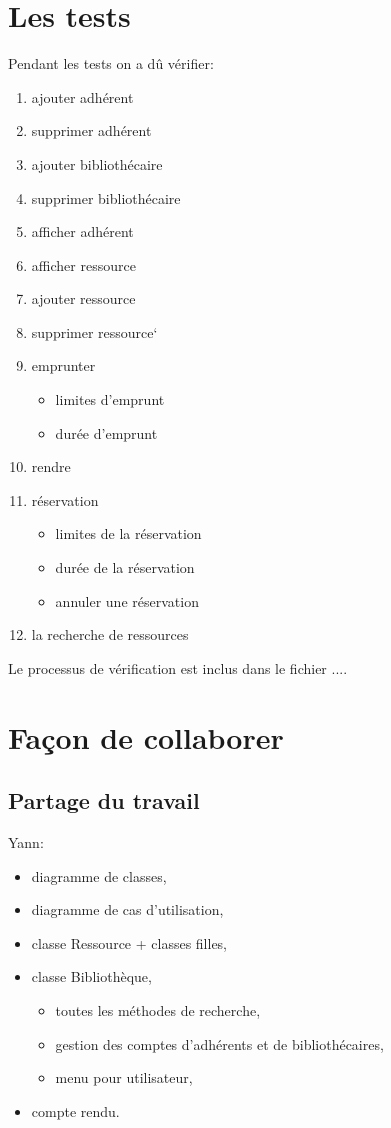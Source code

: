 \documentclass[10pt, a4paper]{article}
\begin{document}
	\section{Les tests}
	Pendant les tests on a dû vérifier:
	\begin{enumerate}
		\item ajouter adhérent
		\item supprimer adhérent
		\item ajouter bibliothécaire
		\item supprimer bibliothécaire
		\item afficher adhérent
		\item afficher ressource
		\item ajouter ressource
		\item supprimer ressource`
		\item emprunter
		\begin{itemize}
			\item limites d'emprunt
			\item durée d'emprunt
		\end{itemize}
		\item rendre
		\item réservation
		\begin{itemize}
			\item limites de la réservation
			\item durée de  la réservation
			\item annuler une réservation
		\end{itemize}
		\item la recherche de ressources 
	\end{enumerate}
	
	
	Le processus de vérification est inclus dans le fichier ....
	
	\section{Façon de collaborer}
		\subsection{Partage du travail}
		Yann:
		\begin{itemize}
			\item diagramme de classes,
			\item diagramme de cas d'utilisation,
			\item classe Ressource + classes filles,
			\item classe Bibliothèque,
			\begin{itemize}
				\item toutes les méthodes de recherche,
				\item gestion des comptes d'adhérents et de bibliothécaires,
				\item menu pour utilisateur,
			\end{itemize}
			\item compte rendu.
			
		\end{itemize}
		
\end{document}
